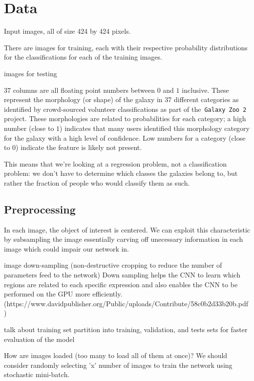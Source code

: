 \section{Data}

Input images, all of size 424 by 424 pixels.

There are  images for training, each with their respective probability distributions for the classifications for each of the training images.

 images for testing

37 columns are all floating point numbers between $0$ and $1$ inclusive. These represent the morphology (or shape) of the galaxy in 37 different categories as identified by crowd-sourced volunteer classifications as part of the~\texttt{Galaxy Zoo 2} project. These morphologies are related to probabilities for each category; a high number (close to $1$) indicates that many users identified this morphology category for the galaxy with a high level of confidence. Low numbers for a category (close to $0$) indicate the feature is likely not present.

This means that we’re looking at a regression problem, not a classification problem: we don’t have to determine which classes the galaxies belong to, but rather the fraction of people who would classify them as such.

\subsection{Preprocessing}

In each image, the object of interest is centered. We can exploit this characteristic by subsampling the image essentially carving off unecessary information in each image which could impair our network in.

image down-sampling (non-destructive cropping to reduce the number of parameters feed to the network)
	Down sampling helps the CNN to learn which regions are related to each specific expression and also enables the CNN to be performed on the GPU more efficiently.(https://www.davidpublisher.org/Public/uploads/Contribute/58c0b2d33b20b.pdf)


talk about training set partition into training, validation, and tests sets for faster evaluation of the model

How are images loaded (too many to load all of them at once)? We should consider randomly selecting 'x' number of images to train the network using stochastic mini-batch.
